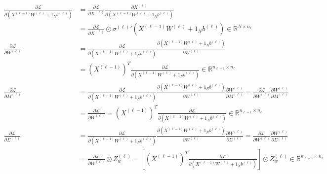 \documentclass[11pt,a4paper]{article}
\def\mathbf#1{#1}%
\theoremstyle{plain}
\theoremstyle{definition}
\theoremstyle{remark}
\begin{document}
\begin{align}
    \frac{\partial \mathcal{L}}{\partial \left( X^{(\ell-1)} W^{(\ell)} + \mathbf{1}_N \mathbf{b}^{(\ell)} \right)} &= \frac{\partial \mathcal{L}}{\partial X^{(\ell)}} \frac{\partial X^{(\ell)}}{\partial \left( X^{(\ell-1)} W^{(\ell)} + \mathbf{1}_N \mathbf{b}^{(\ell)} \right)} \nonumber \\
    &= \frac{\partial \mathcal{L}}{\partial X^{(\ell)}} \odot {\sigma^{(\ell)}}'\!\left( X^{(\ell-1)} W^{(\ell)} + \mathbf{1}_N \mathbf{b}^{(\ell)} \right) \in \mathbb{R}^{N \times n_\ell} \label{eq:reparam_dL_dpre} \\[0.2em]
    \frac{\partial \mathcal{L}}{\partial W^{(\ell)}} &= \frac{\partial \mathcal{L}}{\partial \left( X^{(\ell-1)} W^{(\ell)} + \mathbf{1}_N \mathbf{b}^{(\ell)} \right)} \frac{\partial \left( X^{(\ell-1)} W^{(\ell)} + \mathbf{1}_N \mathbf{b}^{(\ell)} \right)}{\partial W^{(\ell)}} \nonumber \\
    &= \left( X^{(\ell-1)} \right)^T \frac{\partial \mathcal{L}}{\partial \left( X^{(\ell-1)} W^{(\ell)} + \mathbf{1}_N \mathbf{b}^{(\ell)} \right)} \in \mathbb{R}^{n_{\ell-1} \times n_\ell} \label{eq:reparam_dL_dW_hidden} \\[0.2em]
    \frac{\partial \mathcal{L}}{\partial M^{(\ell)}} &= \frac{\partial \mathcal{L}}{\partial \left( X^{(\ell-1)} W^{(\ell)} + \mathbf{1}_N \mathbf{b}^{(\ell)} \right)} \frac{\partial \left( X^{(\ell-1)} W^{(\ell)} + \mathbf{1}_N \mathbf{b}^{(\ell)} \right)}{\partial W^{(\ell)}} \frac{\partial W^{(\ell)}}{\partial M^{(\ell)}} = \frac{\partial \mathcal{L}}{\partial W^{(\ell)}} \frac{\partial W^{(\ell)}}{\partial M^{(\ell)}} \nonumber \\
    &= \frac{\partial \mathcal{L}}{\partial W^{(\ell)}} = \left( X^{(\ell-1)} \right)^T \frac{\partial \mathcal{L}}{\partial \left( X^{(\ell-1)} W^{(\ell)} + \mathbf{1}_N \mathbf{b}^{(\ell)} \right)} \in \mathbb{R}^{n_{\ell-1} \times n_\ell} \label{eq:reparam_dL_dM_hidden} \\[0.2em]
    \frac{\partial \mathcal{L}}{\partial \Sigma^{(\ell)}} &= \frac{\partial \mathcal{L}}{\partial \left( X^{(\ell-1)} W^{(\ell)} + \mathbf{1}_N \mathbf{b}^{(\ell)} \right)} \frac{\partial \left( X^{(\ell-1)} W^{(\ell)} + \mathbf{1}_N \mathbf{b}^{(\ell)} \right)}{\partial W^{(\ell)}} \frac{\partial W^{(\ell)}}{\partial \Sigma^{(\ell)}} = \frac{\partial \mathcal{L}}{\partial W^{(\ell)}} \frac{\partial W^{(\ell)}}{\partial \Sigma^{(\ell)}} \nonumber \\
    &= \frac{\partial \mathcal{L}}{\partial W^{(\ell)}} \odot Z_w^{(\ell)} = \left[ \left( X^{(\ell-1)} \right)^T \frac{\partial \mathcal{L}}{\partial \left( X^{(\ell-1)} W^{(\ell)} + \mathbf{1}_N \mathbf{b}^{(\ell)} \right)} \right] \odot Z_w^{(\ell)} \in \mathbb{R}^{n_{\ell-1} \times n_\ell} \label{eq:reparam_dL_dSigma_hidden} \\[0.2em]

\end{align}
\end{document}
